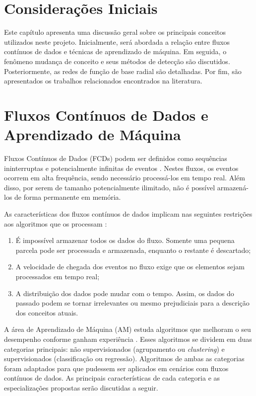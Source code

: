\documentclass[qual, classic, a4paper]{ufbathesis}
\begin{document}
 \label{revisao_bibliografica}
\section{Considerações Iniciais}

Este capítulo apresenta uma discussão geral sobre os principais conceitos utilizados neste projeto.
%
Inicialmente, será abordada a relação entre fluxos contínuos de dados e técnicas de aprendizado de máquina.
%
Em seguida, o fenômeno mudança de conceito e seus métodos de detecção são discutidos.
%
Posteriormente, as redes de função de base radial são detalhadas.
%
Por fim, são apresentados os trabalhos relacionados encontrados na literatura.

\section{Fluxos Contínuos de Dados e Aprendizado de Máquina}

Fluxos Contínuos de Dados (FCDs) podem ser definidos como sequências ininterruptas e potencialmente infinitas de eventos \cite{Aggarwal:2006:DSM:1196418}.
%
Nestes fluxos, os eventos ocorrem em alta frequência, sendo necessário processá-los em tempo real.
%
Além disso, por serem de tamanho potencialmente ilimitado, não é possível armazená-los de forma permanente em memória.
%

As características dos fluxos contínuos de dados implicam nas seguintes restrições aos algoritmos que os processam \cite{bifet2009data}:
%
\begin{enumerate}
    \item É impossível armazenar todos os dados do fluxo. Somente uma pequena parcela pode ser processada e armazenada, enquanto o restante é descartado;
    \item A velocidade de chegada dos eventos no fluxo exige que os elementos sejam processados em tempo real;
    \item A distribuição dos dados pode mudar com o tempo. Assim, os dados do passado podem se tornar irrelevantes ou mesmo prejudiciais para a descrição dos conceitos atuais.
\end{enumerate}

A área de Aprendizado de Máquina (AM) estuda algoritmos que melhoram o seu desempenho conforme ganham experiência \cite{Mitchell:1997:ML:541177}.
%
Esses algoritmos se dividem em duas categorias principais: 
%
não supervisionados (agrupamento ou \textit{clustering}) e supervisionados (classificação ou regressão).
%
Algoritmos de ambas as categorias foram adaptados para que pudessem ser aplicados em cenários com fluxos contínuos de dados.
%
As principais características de cada categoria e as especializações propostas serão discutidas a seguir.
\end{document}
